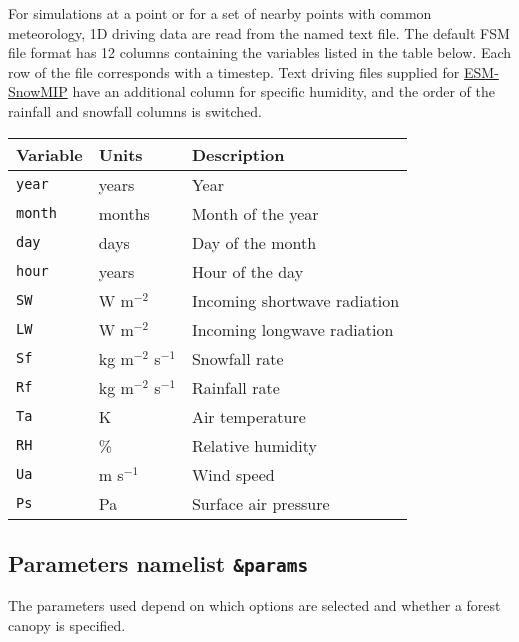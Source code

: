 \documentclass{article}
\begin{document}
For simulations at a point or for a set of nearby points with common meteorology, 1D driving data are read from the named text file. The default FSM file format has 12 columns containing the variables listed in the table below. Each row of the file corresponds with a timestep. Text driving files supplied for \href{https://www.geos.ed.ac.uk/~ressery/ESM-SnowMIP/ESMSnowMIP_Reference_sites.pdf}{ESM-SnowMIP} have an additional column for specific humidity, and the order of the rainfall and snowfall columns is switched.

\begin{tabular}{|l|l|l|}
\hline
Variable & Units                & Description                  \\
\hline
{\tt year}  & years             & Year                         \\
{\tt month} & months            & Month of the year            \\
{\tt day}   & days              & Day of the month             \\
{\tt hour}  & years             & Hour of the day              \\
{\tt SW} & W m$^{-2}$           & Incoming shortwave radiation \\
{\tt LW} & W m$^{-2}$           & Incoming longwave radiation  \\
{\tt Sf} & kg m$^{-2}$ s$^{-1}$ & Snowfall rate                \\
{\tt Rf} & kg m$^{-2}$ s$^{-1}$ & Rainfall rate                \\
{\tt Ta} & K                    & Air temperature              \\
{\tt RH} & \%                   & Relative humidity            \\
{\tt Ua} & m s$^{-1}$           & Wind speed                   \\
{\tt Ps} & Pa                   & Surface air pressure         \\
\hline 
\end{tabular}

\subsection*{Parameters namelist {\tt \&params}}

The parameters used depend on which options are selected and whether a forest canopy is specified.
\end{document}
